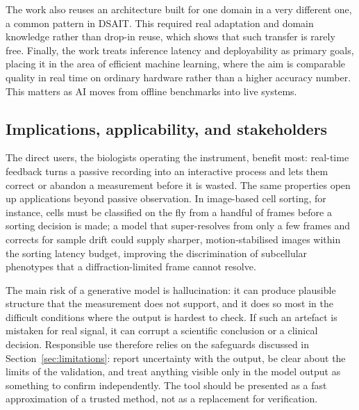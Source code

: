 The work also reuses an architecture built for one domain in a very different one, a common
pattern in DSAIT. This required real adaptation and domain knowledge rather than drop-in
reuse, which shows that such transfer is rarely free. Finally, the work treats inference
latency and deployability as primary goals, placing it in the area of efficient machine
learning, where the aim is comparable quality in real time on ordinary hardware rather than a
higher accuracy number. This matters as AI moves from offline benchmarks into live systems.

\subsection{Implications, applicability, and stakeholders}
The direct users, the biologists operating the instrument, benefit most: real-time feedback
turns a passive recording into an interactive process and lets them correct or abandon a
measurement before it is wasted. The same properties open up applications beyond passive
observation. In image-based cell sorting, for instance, cells must be classified on the fly
from a handful of frames before a sorting decision is made; a model that super-resolves from
only a few frames and corrects for sample drift could supply sharper, motion-stabilised
images within the sorting latency budget, improving the discrimination of subcellular
phenotypes that a diffraction-limited frame cannot resolve. 

The main risk of a generative
model is hallucination: it can produce plausible structure that the measurement does not
support, and it does so most in the difficult conditions where the output is hardest to
check. If such an artefact is mistaken for real signal, it can corrupt a scientific
conclusion or a clinical decision. Responsible use therefore relies on the safeguards
discussed in Section~\ref{sec:limitations}: report uncertainty with the output, be clear
about the limits of the validation, and treat anything visible only in the model output as
something to confirm independently. The tool should be presented as a fast approximation of a
trusted method, not as a replacement for verification.


